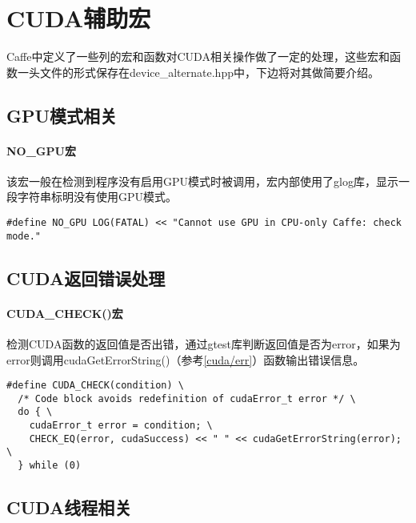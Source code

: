 \chapter{CUDA辅助宏}
Caffe中定义了一些列的宏和函数对CUDA相关操作做了一定的处理，这些宏和函数一头文件的形式保存在device\_alternate.hpp中，下边将对其做简要介绍。
\section{GPU模式相关}\label{cudamacro/gpumode}
\subsubsection{NO\_GPU宏}
该宏一般在检测到程序没有启用GPU模式时被调用，宏内部使用了glog库，显示一段字符串标明没有使用GPU模式。
\begin{verbatim}
#define NO_GPU LOG(FATAL) << "Cannot use GPU in CPU-only Caffe: check mode."
\end{verbatim}
\section{CUDA返回错误处理}\label{cudamacro/err}
\subsubsection{CUDA\_CHECK()宏}
检测CUDA函数的返回值是否出错，通过gtest库判断返回值是否为error，如果为error则调用cudaGetErrorString()（参考\ref{cuda/err}）函数输出错误信息。
\begin{verbatim}
#define CUDA_CHECK(condition) \
  /* Code block avoids redefinition of cudaError_t error */ \
  do { \
    cudaError_t error = condition; \
    CHECK_EQ(error, cudaSuccess) << " " << cudaGetErrorString(error); \
  } while (0)
\end{verbatim}
\section{CUDA线程相关}
